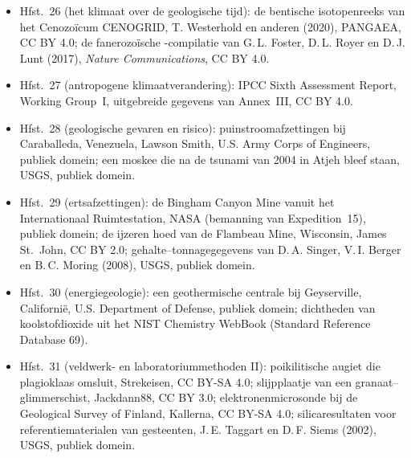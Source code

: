 \begin{itemize}
  \item Hfst.~26 (het klimaat over de geologische tijd): de bentische isotopenreeks van het Cenozoïcum CENOGRID, T. Westerhold en anderen (2020), PANGAEA, CC BY 4.0; de fanerozoïsche -compilatie van G.\,L. Foster, D.\,L. Royer en D.\,J. Lunt (2017), \emph{Nature Communications}, CC BY 4.0.
  \item Hfst.~27 (antropogene klimaatverandering): IPCC Sixth Assessment Report, Working Group~I, uitgebreide gegevens van Annex~III, CC BY 4.0.
  \item Hfst.~28 (geologische gevaren en risico): puinstroomafzettingen bij Caraballeda, Venezuela, Lawson Smith, U.S. Army Corps of Engineers, publiek domein; een moskee die na de tsunami van 2004 in Atjeh bleef staan, USGS, publiek domein.
  \item Hfst.~29 (ertsafzettingen): de Bingham Canyon Mine vanuit het Internationaal Ruimtestation, NASA (bemanning van Expedition~15), publiek domein; de ijzeren hoed van de Flambeau Mine, Wisconsin, James St.~John, CC BY 2.0; gehalte--tonnagegegevens van D.\,A. Singer, V.\,I. Berger en B.\,C. Moring (2008), USGS, publiek domein.
  \item Hfst.~30 (energiegeologie): een geothermische centrale bij Geyserville, Californië, U.S. Department of Defense, publiek domein; dichtheden van koolstofdioxide uit het NIST Chemistry WebBook (Standard Reference Database 69).
  \item Hfst.~31 (veldwerk- en laboratoriummethoden II): poikilitische augiet die plagioklaas omsluit, Strekeisen, CC BY-SA 4.0; slijpplaatje van een granaat--glimmerschist, Jackdann88, CC BY 3.0; elektronenmicrosonde bij de Geological Survey of Finland, Kallerna, CC BY-SA 4.0; silicaresultaten voor referentiematerialen van gesteenten, J.\,E. Taggart en D.\,F. Siems (2002), USGS, publiek domein.
\end{itemize}
